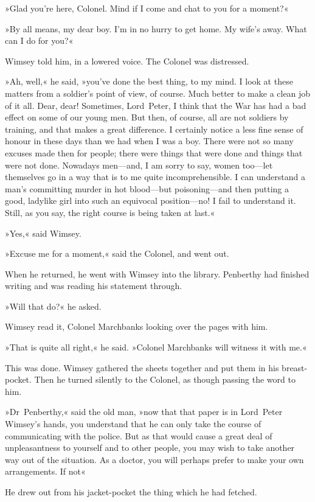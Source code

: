 »Glad you're here, Colonel. Mind if I come and chat to you for a moment?«

»By all means, my dear boy. I'm in no hurry to get home. My wife's away. What can I do for you?«

Wimsey told him, in a lowered voice. The Colonel was distressed.

»Ah, well,« he said, »you've done the best thing, to my mind. I look at these matters from a soldier's point of view, of course. Much better to make a clean job of it all. Dear, dear! Sometimes, Lord~Peter, I think that the War has had a bad effect on some of our young men. But then, of course, all are not soldiers by training, and that makes a great difference. I certainly notice a less fine sense of honour in these days than we had when I was a boy. There were not so many excuses made then for people; there were things that were done and things that were not done. Nowadays men—and, I am sorry to say, women too—let themselves go in a way that is to me quite incomprehensible. I can understand a man's committing murder in hot blood—but poisoning—and then putting a good, ladylike girl into such an equivocal position—no! I fail to understand it. Still, as you say, the right course is being taken at last.«

»Yes,« said Wimsey.

»Excuse me for a moment,« said the Colonel, and went out.

When he returned, he went with Wimsey into the library. Penberthy had finished writing and was reading his statement through.

»Will that do?« he asked.

Wimsey read it, Colonel Marchbanks looking over the pages with him.

»That is quite all right,« he said. »Colonel Marchbanks will witness it with me.«

This was done. Wimsey gathered the sheets together and put them in his breast-pocket. Then he turned silently to the Colonel, as though passing the word to him.

»Dr~Penberthy,« said the old man, »now that that paper is in Lord~Peter Wimsey's hands, you understand that he can only take the course of communicating with the police. But as that would cause a great deal of unpleasantness to yourself and to other people, you may wish to take another way out of the situation. As a doctor, you will perhaps prefer to make your own arrangements. If not\longdash«

He drew out from his jacket-pocket the thing which he had fetched.

